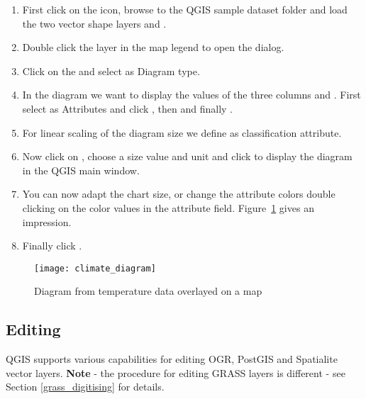\begin{enumerate}
\item First click on the  icon,
browse to the QGIS sample dataset folder and load the two vector shape layers
 and .
\item Double click the  layer in the map legend to open the
 dialog.
\item Click on the  and select  as
Diagram type.
\item In the diagram we want to display the values of the three columns
 and . First select
 as Attributes and click , then
 and finally .  
\item For linear scaling of the diagram size we define 
as classification attribute.
\item Now click on , choose a size value and unit
and click  to display the diagram in the QGIS main window.
\item You can now adapt the chart size, or change the attribute colors double
clicking on the color values in the attribute field.
Figure~\ref{fig:climatediagram} gives an impression.
\item Finally click . 
\end{enumerate}

\begin{figure}[ht]
   \begin{center}
   \caption{Diagram from temperature data overlayed on a map \nixcaption}\label{fig:climatediagram}\smallskip
   \texttt{[image: climate\_diagram]}
\end{center}
\end{figure}

\subsection{Editing}

QGIS supports various capabilities for editing OGR, PostGIS and Spatialite 
vector layers. \textbf{Note} - the procedure for editing GRASS layers is 
different - see Section \ref{grass_digitising} for details.

\begin{Tip}[ht]\caption{\textsc{Concurrent Edits}}
\end{Tip}

